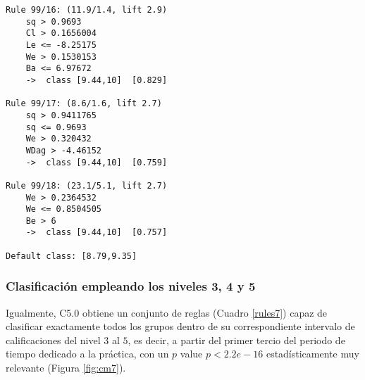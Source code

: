 \begin{tcolorbox}[title=Reglas de clasificación para identificar intervalos de notas.]
\begin{multicols}{3}
\begin{verbatim}
Rule 99/16: (11.9/1.4, lift 2.9)
	sq > 0.9693
	Cl > 0.1656004
	Le <= -8.25175
	We > 0.1530153
	Ba <= 6.97672
	->  class [9.44,10]  [0.829]

Rule 99/17: (8.6/1.6, lift 2.7)
	sq > 0.9411765
	sq <= 0.9693
	We > 0.320432
	WDag > -4.46152
	->  class [9.44,10]  [0.759]

Rule 99/18: (23.1/5.1, lift 2.7)
	We > 0.2364532
	We <= 0.8504505
	Be > 6
	->  class [9.44,10]  [0.757]
	
Default class: [8.79,9.35]
    \end{verbatim}
  \end{multicols}
\label{rules8}
\end{tcolorbox}

\subsubsection{Clasificación empleando los niveles 3, 4 y 5}

Igualmente, C5.0 obtiene un conjunto de reglas (Cuadro \ref{rules7}) capaz de clasificar exactamente todos los grupos dentro de su correspondiente intervalo de calificaciones del nivel $3$ al $5$, es decir, a partir del primer tercio del periodo de tiempo dedicado a la práctica, con un $p$ value $p < 2.2e-16$ estadísticamente muy relevante (Figura \ref{fig:cm7}).

